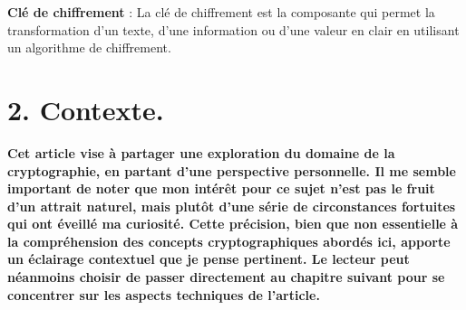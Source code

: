 \documentclass[
  paper=a4,
  ,captions=tableheading
]{scrartcl}
\begin{document}
\textbf{Clé de chiffrement} : La clé de chiffrement est la composante
qui permet la transformation d'un texte, d'une information ou d'une
valeur en clair en utilisant un algorithme de chiffrement.

\section{2. Contexte.}\label{contexte.}

\textbf{Cet article vise à partager une exploration du domaine de la
cryptographie, en partant d'une perspective personnelle. Il me semble
important de noter que mon intérêt pour ce sujet n'est pas le fruit d'un
attrait naturel, mais plutôt d'une série de circonstances fortuites qui
ont éveillé ma curiosité. Cette précision, bien que non essentielle à la
compréhension des concepts cryptographiques abordés ici, apporte un
éclairage contextuel que je pense pertinent. Le lecteur peut néanmoins
choisir de passer directement au chapitre suivant pour se concentrer sur
les aspects techniques de l'article.}
\end{document}
